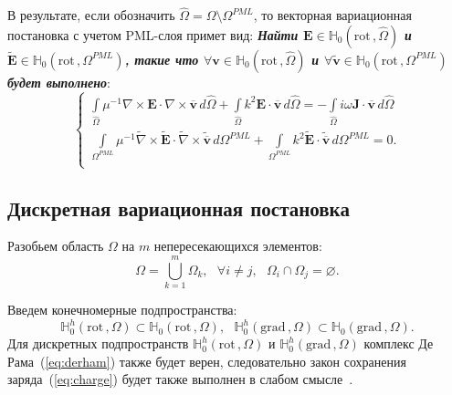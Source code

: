 \documentclass[a4paper,12pt]{article}
\begin{document}
В результате, если обозначить $\widehat{\Omega} = \Omega \setminus {\Omega^{PML}}$, то векторная вариационная постановка с учетом PML-слоя примет вид: \textbf{\textit{Найти $\mathbf{E} \in \mathbb{H}_{0}( \mathrm{rot}\,, \widehat{\Omega} )$ и  $\tilde{\mathbf{E}} \in \mathbb{H}_{0}( \mathrm{rot}\,, {\Omega^{PML}} )$, такие что $\forall \mathbf{v} \in \mathbb{H}_{0}( \mathrm{rot}\,, \widehat{\Omega} )$ и $\forall \tilde{\mathbf{v}} \in \mathbb{H}_{0}( \mathrm{rot}\,, {\Omega^{PML}} )$ будет выполнено}}:
\begin{equation*}
	\begin{cases}
		\displaystyle
		\int\limits_{\widehat{\Omega}} \mu^{-1} \nabla \times \mathbf{E} \cdot \nabla \times \overline{\mathbf{v}} \,d\widehat{\Omega} + \int\limits_{\widehat{\Omega}} k^{2} \mathbf{E} \cdot \overline{\mathbf{v}} \,d\widehat{\Omega} = - \int\limits_{\widehat{\Omega}} i \omega \mathbf{J} \cdot \overline{\mathbf{v}} \,d\widehat{\Omega} \\
		\displaystyle
		\int\limits_{{\Omega^{PML}}} \mu^{-1} \tilde{\nabla} \times \tilde{\mathbf{E}} \cdot \tilde{\nabla} \times \tilde{\overline{\mathbf{v}}} \,d{\Omega^{PML}} + \int\limits_{{\Omega^{PML}}} k^{2} \tilde{\mathbf{E}} \cdot \tilde{\overline{\mathbf{v}}} \,d{\Omega^{PML}} = 0 . \\
	\end{cases}
\end{equation*}


\subsection{Дискретная вариационная постановка}
Разобьем область $\Omega$ на $m$ непересекающихся элементов:
\begin{equation*}
	\Omega = \bigcup\limits_{k=1}^{m} \Omega_k , \text{~~} \forall i \neq j , \text{~~} \Omega_i \cap \Omega_j = \varnothing .
\end{equation*}

Введем конечномерные подпространства:
\begin{equation*}
	\mathbb{H}_{0}^h( \mathrm{rot}\,, \Omega ) \subset \mathbb{H}_{0}( \mathrm{rot}\,, \Omega ) , \text{~~}
	\mathbb{H}_{0}^h( \mathrm{grad}\,, \Omega ) \subset \mathbb{H}_{0}( \mathrm{grad}\,, \Omega ) .
\end{equation*}
Для дискретных подпространств $\mathbb{H}_{0}^h( \mathrm{rot}\,, \Omega )$ и $\mathbb{H}_{0}^h( \mathrm{grad}\,, \Omega )$ комплекс Де Рама~(\ref{eq:derham}) также будет верен, следовательно закон сохранения заряда~(\ref{eq:charge}) будет также выполнен в слабом смысле~\citep{epov}.
\end{document}
